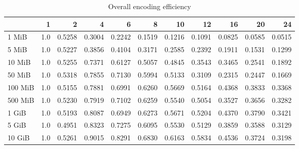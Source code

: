 \begin{table}[!h]
	\caption{Overall encoding efficiency}
	\begin{tabular}{lrrrrrrrrrr}
		\toprule
		\diagbox{File sizes }{Threads} &   1  &      2  &      4  &      6  &      8  &      10 &      12 &      16 &      20 &      24 \\
		\midrule
		1 MiB   &  1.0 &  0.5258 &  0.3004 &  0.2242 &  0.1519 &  0.1216 &  0.1091 &  0.0825 &  0.0585 &  0.0515 \\
		5 MiB   &  1.0 &  0.5227 &  0.3856 &  0.4104 &  0.3171 &  0.2585 &  0.2392 &  0.1911 &  0.1531 &  0.1299 \\
		10 MiB  &  1.0 &  0.5255 &  0.7371 &  0.6127 &  0.5057 &  0.4845 &  0.3543 &  0.3465 &  0.2541 &  0.1892 \\
		50 MiB  &  1.0 &  0.5318 &  0.7855 &  0.7130 &  0.5994 &  0.5133 &  0.3109 &  0.2315 &  0.2447 &  0.1669 \\
		100 MiB &  1.0 &  0.5155 &  0.7881 &  0.6991 &  0.6260 &  0.5669 &  0.5164 &  0.4368 &  0.3833 &  0.3368 \\
		500 MiB &  1.0 &  0.5230 &  0.7919 &  0.7102 &  0.6259 &  0.5540 &  0.5054 &  0.3527 &  0.3656 &  0.3282 \\
		1 GiB   &  1.0 &  0.5193 &  0.8087 &  0.6949 &  0.6273 &  0.5671 &  0.5204 &  0.4370 &  0.3790 &  0.3421 \\
		5 GiB   &  1.0 &  0.4951 &  0.8323 &  0.7275 &  0.6095 &  0.5530 &  0.5129 &  0.3859 &  0.3588 &  0.3129 \\
		10 GiB  &  1.0 &  0.5261 &  0.9015 &  0.8291 &  0.6830 &  0.6163 &  0.5834 &  0.4536 &  0.3724 &  0.3198 \\
		\bottomrule
	\end{tabular}
\end{table}
